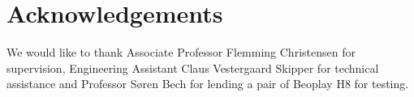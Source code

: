 \section*{Acknowledgements}
We would like to thank Associate Professor Flemming Christensen for supervision, Engineering Assistant Claus Vestergaard Skipper for technical assistance and Professor Søren Bech for lending a pair of Beoplay H8 for testing. 
